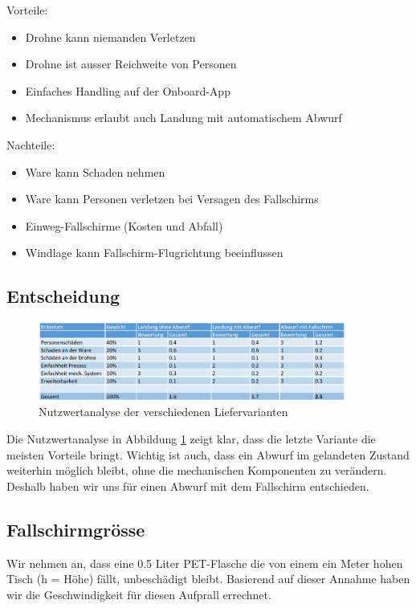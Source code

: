 Vorteile:
\begin{itemize}
	\item Drohne kann niemanden Verletzen
	\item Drohne ist ausser Reichweite von Personen
	\item Einfaches Handling auf der Onboard-App
	\item Mechanismus erlaubt auch Landung mit automatischem Abwurf
\end{itemize}


Nachteile:
\begin{itemize}
	\item Ware kann Schaden nehmen
	\item Ware kann Personen verletzen bei Versagen des Fallschirms
	\item Einweg-Fallschirme (Kosten und Abfall)
	\item Windlage kann Fallschirm-Flugrichtung beeinflussen
\end{itemize}


\subsection{Entscheidung}

\begin{figure}[H]
	\centering
	\includegraphics[width=0.9\textwidth] {images/nutzwertanalyse_abwurf.png}
	\caption{Nutzwertanalyse der verschiedenen Liefervarianten}
	\label{fig:nutzwertanalyse_abwurf}
\end{figure}


Die Nutzwertanalyse in Abbildung \ref{fig:nutzwertanalyse_abwurf} zeigt klar, dass die letzte Variante die meisten Vorteile bringt. Wichtig ist auch, dass ein Abwurf im gelandeten Zustand weiterhin möglich bleibt, ohne die mechanischen Komponenten zu verändern. Deshalb haben wir uns für einen Abwurf mit dem Fallschirm entschieden.

\subsection{Fallschirmgrösse}
Wir nehmen an, dass eine 0.5 Liter PET-Flasche die von einem ein Meter hohen Tisch (h = Höhe) fällt, unbeschädigt bleibt. Basierend auf dieser Annahme haben wir die Geschwindigkeit für diesen Aufprall errechnet.

